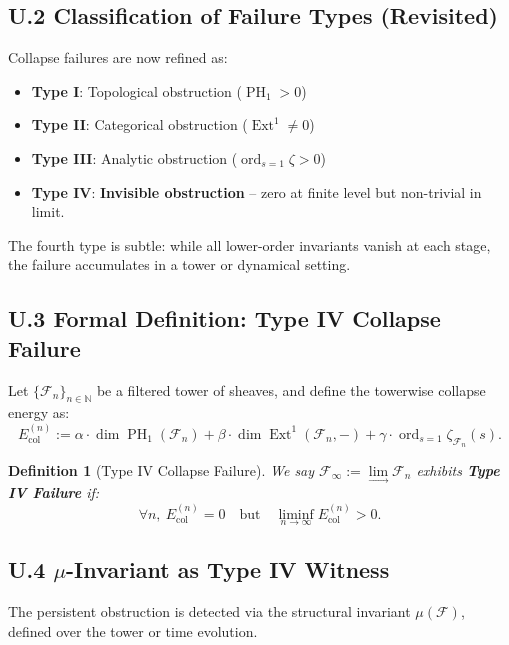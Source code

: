 \documentclass[11pt]{article}
\newtheorem{definition}[theorem]{Definition}
\DeclareMathOperator{\Ext}{Ext}
\DeclareMathOperator{\PH}{PH}
\newcommand{\ord}{\operatorname{ord}}
\begin{document}
\subsection*{U.2 Classification of Failure Types (Revisited)}

Collapse failures are now refined as:

\begin{itemize}
  \item \textbf{Type I}: Topological obstruction (\( \PH_1 > 0 \))
  \item \textbf{Type II}: Categorical obstruction (\( \Ext^1 \neq 0 \))
  \item \textbf{Type III}: Analytic obstruction (\( \ord_{s=1} \zeta > 0 \))
  \item \textbf{Type IV}: \textbf{Invisible obstruction} – zero at finite level but non-trivial in limit.
\end{itemize}

The fourth type is subtle: while all lower-order invariants vanish at each stage, the failure accumulates in a tower or dynamical setting.

\subsection*{U.3 Formal Definition: Type IV Collapse Failure}

Let \( \{ \mathcal{F}_n \}_{n \in \mathbb{N}} \) be a filtered tower of sheaves, and define the towerwise collapse energy as:
\[
E_{\mathrm{col}}^{(n)} := \alpha \cdot \dim \PH_1(\mathcal{F}_n) + \beta \cdot \dim \Ext^1(\mathcal{F}_n, -) + \gamma \cdot \ord_{s=1} \zeta_{\mathcal{F}_n}(s).
\]

\begin{definition}[Type IV Collapse Failure]
\label{def:typeIV}
We say \( \mathcal{F}_\infty := \lim\limits_{\longrightarrow} \mathcal{F}_n \) exhibits \textbf{Type IV Failure} if:
\[
\forall n,~ E_{\mathrm{col}}^{(n)} = 0 \quad \text{but} \quad \liminf_{n \to \infty} E_{\mathrm{col}}^{(n)} > 0.
\]
\end{definition}

\subsection*{U.4 \texorpdfstring{\( \mu \)}{mu}-Invariant as Type IV Witness}

The persistent obstruction is detected via the structural invariant \( \mu(\mathcal{F}) \), defined over the tower or time evolution.
\end{document}
